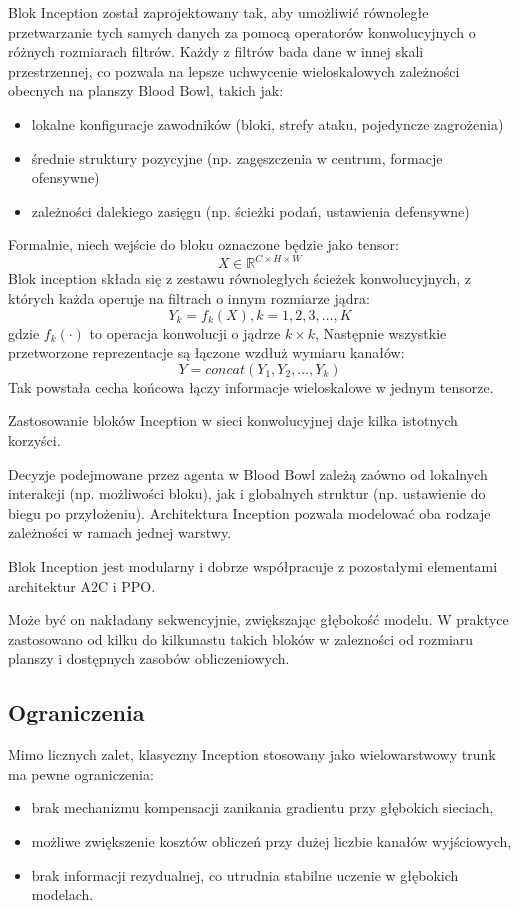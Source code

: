 Blok Inception został zaprojektowany tak, aby umożliwić równoległe przetwarzanie tych samych danych za pomocą operatorów konwolucyjnych o różnych rozmiarach filtrów. Każdy z filtrów bada dane w innej skali przestrzennej, co pozwala na lepsze uchwycenie wieloskalowych zależności obecnych na planszy Blood Bowl, takich jak:
\begin{itemize}
	\item lokalne konfiguracje zawodników (bloki, strefy ataku, pojedyncze zagrożenia)
	\item średnie struktury pozycyjne (np. zagęszczenia w centrum, formacje ofensywne)
	\item zależności dalekiego zasięgu (np. ścieżki podań, ustawienia defensywne)
\end{itemize}
Formalnie, niech wejście do bloku oznaczone będzie jako tensor:
\[X \in \mathbb{R}^{C\times H\times W}\]
Blok inception składa się z zestawu równoległych ścieżek konwolucyjnych, z których każda operuje na filtrach o innym rozmiarze jądra:
\[Y_k = f_k(X),  k = 1,2,3,\ldots,K\]
gdzie $f_k(\cdot)$ to operacja konwolucji o jądrze $k\times k$, Następnie wszystkie przetworzone reprezentacje są łączone wzdłuż wymiaru kanałów:
\[Y = concat(Y_1,Y_2,\ldots,Y_k)\]
Tak powstała cecha końcowa łączy informacje wieloskalowe w jednym tensorze.

Zastosowanie bloków Inception w sieci konwolucyjnej daje kilka istotnych korzyści.

Decyzje podejmowane przez agenta w Blood Bowl zależą zaówno od lokalnych interakcji (np. możliwości bloku), jak i globalnych struktur (np. ustawienie do biegu po przyłożeniu). Architektura Inception pozwala modelować oba rodzaje zależności w ramach jednej warstwy.

Blok Inception jest modularny i dobrze współpracuje z pozostałymi elementami architektur A2C i PPO. 

Może być on nakładany sekwencyjnie, zwiększając głębokość modelu. W praktyce zastosowano od kilku do kilkunastu takich bloków w zalezności od rozmiaru planszy i dostępnych zasobów obliczeniowych.

\subsection*{Ograniczenia}
Mimo licznych zalet, klasyczny Inception stosowany jako wielowarstwowy trunk ma pewne ograniczenia:
\begin{itemize}
	\item brak mechanizmu kompensacji zanikania gradientu przy głębokich sieciach,
	\item możliwe zwiększenie kosztów obliczeń przy dużej liczbie kanałów wyjściowych,
	\item brak informacji rezydualnej, co utrudnia stabilne uczenie w głębokich modelach.
\end{itemize}

